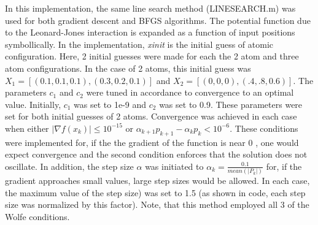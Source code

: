 \documentclass{article}
\begin{document}
 In this implementation, the same line search method  (LINESEARCH.m) was used for both gradient descent and  BFGS algorithms. The potential function due to the Leonard-Jones interaction is expanded as a function of input positions symbollically.  In the implementation, \emph{xinit} is the initial guess of atomic configuration. Here, 2 initial guesses were made for each the 2 atom and three atom configurations. In the case of 2 atoms, this initial guess was $X_{1}=[(0.1,0.1,0.1), (0.3,0.2,0.1) ] $ and $X_{2}=[(0,0,0), (.4,.8,0.6) ] $. The parameters $c_{1}$ and $c_{2}$ were tuned in accordance to convergence to an optimal value. Initially, $c_{1}$ was set to 1e-9 and $c_{2}$ was set to 0.9. These parameters were set for both initial guesses of 2 atoms. Convergence was achieved in each case when either $|\nabla f (x_{k})| \leq 10^{-15}$  or $\alpha_{k+1}p_{k+1} - \alpha_{k}p_{k}< 10^{-6}$. These conditions were implemented for, if the the gradient of the function is near 0 , one would expect convergence and the second condition enforces that the solution does not oscillate. In addition, the step size $\alpha$ was initiated to  $\alpha_{k} = \frac{0.1}{mean(|P_{k}|)}$ for, if the gradient approaches small values, large step sizes would be allowed.
 In each case, the maximum value of the step size) was set to 1.5 (as shown in code, each step size was normalized by this factor).  Note, that this method employed all 3 of the Wolfe conditions.
\end{document}
